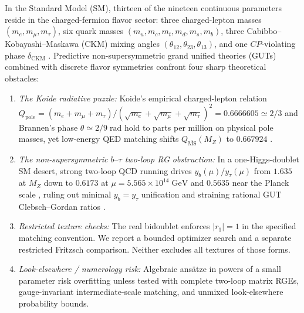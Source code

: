 \documentclass[11pt,a4paper]{article}
\begin{document}
In the Standard Model (SM), thirteen of the nineteen continuous parameters reside in the charged-fermion flavor sector: three charged-lepton masses $(m_e, m_\mu, m_\tau)$, six quark masses $(m_u, m_c, m_t, m_d, m_s, m_b)$, three Cabibbo--Kobayashi--Maskawa (CKM) mixing angles $(\theta_{12}, \theta_{23}, \theta_{13})$, and one $CP$-violating phase $\delta_{\mathrm{CKM}}$ \cite{PDG2024,Cabibbo1963,KobayashiMaskawa1973}. Predictive non-supersymmetric grand unified theories (GUTs) \cite{PatiSalam1974,FritzschMinkowski1975,GeorgiJarlskog1979} combined with discrete flavor symmetries \cite{MaRajasekaran2001,AltarelliFeruglio2010} confront four sharp theoretical obstacles:
\begin{enumerate}[label=(\arabic*),leftmargin=1.8em,itemsep=2pt]
\item \emph{The Koide radiative puzzle:} Koide's empirical charged-lepton relation $Q_{\mathrm{pole}} = (m_e + m_\mu + m_\tau)/(\sqrt{m_e} + \sqrt{m_\mu} + \sqrt{m_\tau})^2 = 0.6666605 \simeq 2/3$ \cite{Koide1983} and Brannen's phase $\theta \simeq 2/9\;\mathrm{rad}$ \cite{Brannen2006} hold to parts per million on physical pole masses, yet low-energy QED matching shifts $Q_{\overline{\mathrm{MS}}}(M_Z)$ to $0.667924$ \cite{Sumino2009,XingZhangZhou2012}.
\item \emph{The non-supersymmetric $b\text{--}\tau$ two-loop RG obstruction:} In a one-Higgs-doublet SM desert, strong two-loop QCD running drives $y_b(\mu)/y_\tau(\mu)$ from $1.635$ at $M_Z$ down to $0.6173$ at $\mu = 5.565\times 10^{14}\;\mathrm{GeV}$ and $0.5635$ near the Planck scale \cite{Arason1992,XingZhangZhou2012,HuangZhou2021}, ruling out minimal $y_b = y_\tau$ unification and straining rational GUT Clebsch--Gordan ratios \cite{AntuschSpinrath2009,AntuschMaurer2013}.
\item \emph{Restricted texture checks:} The real bidoublet enforces $|r_1|=1$ in the specified matching convention. We report a bounded optimizer search and a separate restricted Fritzsch comparison. Neither excludes all textures of those forms.
\item \emph{Look-elsewhere / numerology risk:} Algebraic ans\"atze in powers of a small parameter risk overfitting unless tested with complete two-loop matrix RGEs, gauge-invariant intermediate-scale matching, and unmixed look-elsewhere probability bounds.
\end{enumerate}
\end{document}
